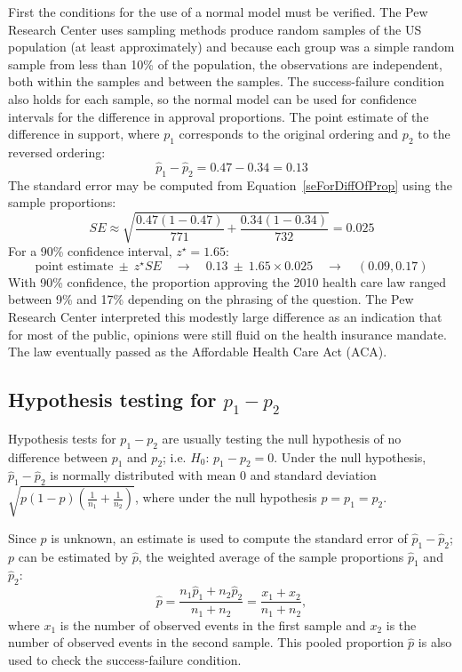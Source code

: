 \begin{example}
{}
First the conditions for the use of a normal model must be verified. The Pew Research Center uses sampling methods produce random samples of the US population (at least approximately) and because each group was a simple random sample from less than 10\% of the population, the observations are independent, both within the samples and between the samples. The success-failure condition also holds for each sample, so the normal model can be used for confidence intervals for the difference in approval proportions.  The point estimate of the difference in support, where $p_1$ corresponds to the original ordering and $p_2$ to the reversed ordering:
$$\hat{p}_{1} - \hat{p}_{2} = 0.47 - 0.34 = 0.13$$
The standard error may be computed from Equation~\eqref{seForDiffOfProp} using the sample proportions:
$$SE \approx \sqrt{\frac{0.47(1-0.47)}{771} + \frac{0.34(1-0.34)}{732}} = 0.025$$
For a 90\% confidence interval, $z^{\star} = 1.65$:
$$\text{point estimate} \ \pm\ z^{\star}SE \quad \to \quad 0.13 \ \pm\ 1.65 \times  0.025 \quad \to \quad (0.09, 0.17)$$
With 90\% confidence, the proportion approving the 2010 health care law ranged between 9\% and 17\% depending on the phrasing of the question. The Pew Research Center interpreted this modestly large difference as an indication that for most of the public, opinions were still fluid on the health insurance mandate.  The law eventually passed as the Affordable Health Care Act (ACA).
\end{example}


\subsection{Hypothesis testing for $p_1 -p_2$}

Hypothesis tests for $p_1 - p_2$ are usually testing the null hypothesis of no difference between $p_1$ and $p_2$; i.e. $H_0:\,p_1 - p_2 = 0$. Under the null hypothesis, $\hat{p}_1 - \hat{p}_2$ is normally distributed with mean 0 and standard deviation $\sqrt{p(1-p)(\frac{1}{n_1} + \frac{1}{n_2})}$, where under the null hypothesis $p = p_1 = p_2$.

Since $p$ is unknown, an estimate is used to compute the standard error of $\hat{p}_1 - \hat{p}_2$; $p$ can be estimated by $\hat{p}$, the weighted average of the sample proportions $\hat{p}_1$ and $\hat{p}_2$:
\[\hat{p} = \dfrac{n_{1}\hat{p}_1 + n_{2}\hat{p}_2}{n_{1} + n_{2}} = \dfrac{x_{1} + x_{2}}{n_{1} + n_{2}}, \]
where $x_1$ is the number of observed events in the first sample and $x_2$ is the number of observed events in the second sample. This pooled proportion $\hat{p}$ is also used to check the success-failure condition.

